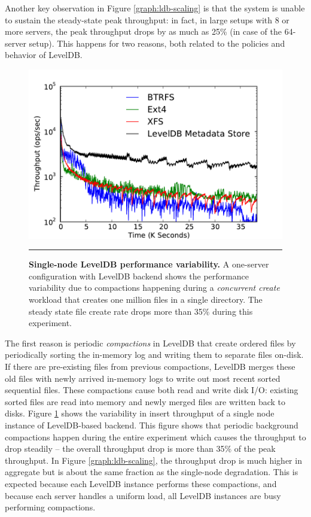 Another key observation in Figure \ref{graph:ldb-scaling} is that the system is
unable to sustain the steady-state peak throughput: in fact, in large setups
with 8 or more servers, the peak throughput drops by as much as 25\% (in case
of the 64-server setup). 
This happens for two reasons, both related to the policies and behavior of
LevelDB.

\begin{figure}[t]  %
\centerline{\includegraphics[scale=0.3]{./figs/ldb_insertrate_onenode}}
\caption{
\textbf{Single-node LevelDB performance variability.}
{\small
A one-server configuration with LevelDB backend shows the performance
variability due to compactions happening during a \textit{concurrent create} 
workload that creates one million files in a single directory. The steady state
file create rate drops more than 35\% during this experiment.
}
}
\vspace{15pt}
\hrule 
\label{graph:ldb-singlenode}
\end{figure}       %

The first reason is periodic \textit{compactions} in LevelDB that create
ordered files 
by periodically sorting the in-memory log and writing them to separate files 
on-disk. If there are pre-existing files from previous compactions, LevelDB merges 
these old files with newly arrived in-memory logs to write out most recent sorted 
sequential files. These compactions cause both read and write disk I/O:
existing sorted files are read into memory and newly merged files are written
back to disks. Figure \ref{graph:ldb-singlenode} shows the variability in insert
throughput of a single node instance of LevelDB-based backend. This figure
shows that periodic background compactions happen during the entire experiment
which causes the throughput to drop steadily -- the overall throughput drop is
more than 35\% of the peak throughput.
In Figure \ref{graph:ldb-scaling}, the throughput drop is much higher in
aggregate but is about the same fraction as the single-node degradation.
This is expected because each LevelDB instance performs these compactions, and 
because each \giga{} server handles a uniform load, all LevelDB instances are busy
performing compactions.  


